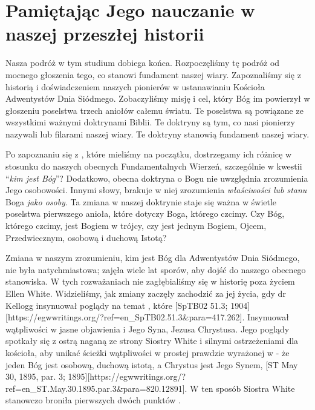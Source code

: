 \chapter{Pamiętając Jego nauczanie w naszej przeszłej historii}

Nasza podróż w tym studium dobiega końca. Rozpoczęliśmy tę podróż od mocnego głoszenia tego, co stanowi fundament naszej wiary. Zapoznaliśmy się z historią i doświadczeniem naszych pionierów w ustanawianiu Kościoła Adwentystów Dnia Siódmego. Zobaczyliśmy misję i cel, który Bóg im powierzył w głoszeniu poselstwa trzech aniołów całemu światu. Te poselstwa są powiązane ze wszystkimi ważnymi doktrynami Biblii. Te doktryny są tym, co nasi pionierzy nazywali  lub filarami naszej wiary. Te doktryny stanowią fundament naszej wiary.

Po zapoznaniu się z , które mieliśmy na początku, dostrzegamy ich różnicę w stosunku do naszych obecnych Fundamentalnych Wierzeń, szczególnie w kwestii “\textit{kim jest Bóg}”? Dodatkowo, obecna doktryna o Bogu nie uwzględnia zrozumienia Jego osobowości. Innymi słowy, brakuje w niej zrozumienia \textit{właściwości lub stanu} Boga \textit{jako osoby}. Ta zmiana w naszej doktrynie staje się ważna w świetle poselstwa pierwszego anioła, które dotyczy Boga, którego czcimy. Czy Bóg, którego czcimy, jest Bogiem w trójcy, czy jest jednym Bogiem, Ojcem, Przedwiecznym, osobową i duchową Istotą?

Zmiana w naszym zrozumieniu, kim jest Bóg dla Adwentystów Dnia Siódmego, nie była natychmiastowa; zajęła wiele lat sporów, aby dojść do naszego obecnego stanowiska. W tych rozważaniach nie zagłębialiśmy się w historię poza życiem Ellen White. Widzieliśmy, jak zmiany zaczęły zachodzić za jej życia, gdy dr Kellogg insynuował poglądy na temat , które [SpTB02 51.3; 1904][https://egwwritings.org/?ref=en\_SpTB02.51.3&para=417.262]. Insynuował wątpliwości w jasne objawienia  i Jego Syna, Jezusa Chrystusa. Jego poglądy spotkały się z ostrą naganą ze strony Siostry White i silnymi ostrzeżeniami dla kościoła, aby unikać ścieżki wątpliwości w prostej prawdzie wyrażonej w  - że jeden Bóg jest osobową, duchową istotą, a Chrystus jest Jego Synem, [ST May 30, 1895, par. 3; 1895][https://egwwritings.org/?ref=en\_ST.May.30.1895.par.3&para=820.12891]. W ten sposób Siostra White stanowczo broniła pierwszych dwóch punktów .

